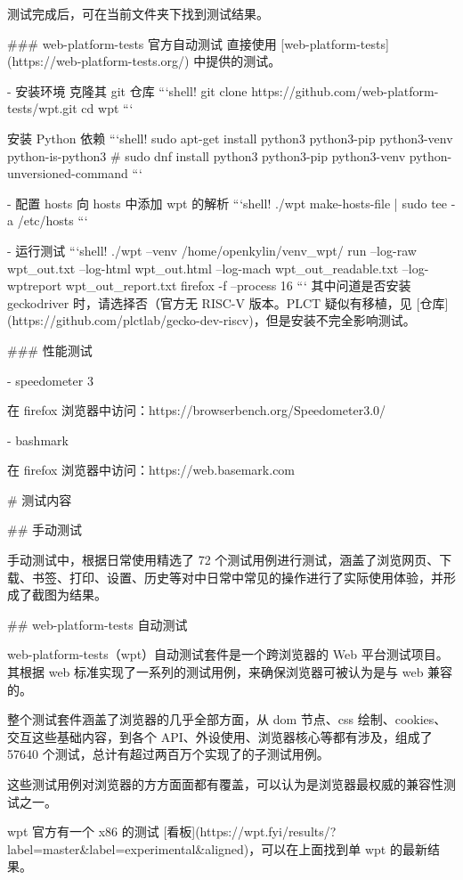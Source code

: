 \documentclass{article}
\begin{document}
\begin{markdown}
测试完成后，可在当前文件夹下找到测试结果。

### web-platform-tests 官方自动测试
直接使用 [web-platform-tests](https://web-platform-tests.org/) 中提供的测试。

- 安装环境
克隆其 git 仓库
```shell!
git clone https://github.com/web-platform-tests/wpt.git
cd wpt
```

安装 Python 依赖
```shell!
sudo apt-get install python3 python3-pip python3-venv python-is-python3
# sudo dnf install python3 python3-pip python3-venv python-unversioned-command
```

- 配置 hosts
向 hosts 中添加 wpt 的解析
```shell!
./wpt make-hosts-file | sudo tee -a /etc/hosts
```

- 运行测试
```shell!
./wpt --venv /home/openkylin/venv_wpt/ run --log-raw wpt_out.txt --log-html wpt_out.html --log-mach wpt_out_readable.txt --log-wptreport wpt_out_report.txt firefox -f --process 16
```
其中问道是否安装 geckodriver 时，请选择否（官方无 RISC-V 版本。PLCT 疑似有移植，见 [仓库](https://github.com/plctlab/gecko-dev-riscv)，但是安装不完全影响测试。

### 性能测试

- speedometer 3

在 firefox 浏览器中访问：https://browserbench.org/Speedometer3.0/

- bashmark

在 firefox 浏览器中访问：https://web.basemark.com

# 测试内容

## 手动测试

手动测试中，根据日常使用精选了 72 个测试用例进行测试，涵盖了浏览网页、下载、书签、打印、设置、历史等对中日常中常见的操作进行了实际使用体验，并形成了截图为结果。

## web-platform-tests 自动测试

web-platform-tests（wpt）自动测试套件是一个跨浏览器的 Web 平台测试项目。其根据 web 标准实现了一系列的测试用例，来确保浏览器可被认为是与 web 兼容的。

整个测试套件涵盖了浏览器的几乎全部方面，从 dom 节点、css 绘制、cookies、交互这些基础内容，到各个 API、外设使用、浏览器核心等都有涉及，组成了 57640 个测试，总计有超过两百万个实现了的子测试用例。

这些测试用例对浏览器的方方面面都有覆盖，可以认为是浏览器最权威的兼容性测试之一。

wpt 官方有一个 x86 的测试 [看板](https://wpt.fyi/results/?label=master&label=experimental&aligned)，可以在上面找到单 wpt 的最新结果。


\end{markdown}
\end{document}
